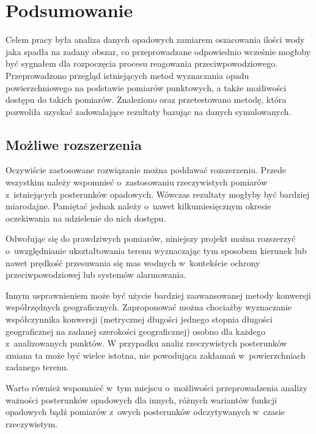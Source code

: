 \chapter{Podsumowanie}

Celem pracy była analiza danych opadowych zamiarem oszacowania ilości wody jaka spadła na zadany obszar, co przeprowadzane odpowiednio wcześnie mogłoby być sygnałem dla rozpoczęcia procesu reagowania przeciwpowodziowego. Przeprowadzono przegląd istniejących metod wyznaczania opadu powierzchniowego na podstawie pomiarów punktowych, a także możliwości dostępu do takich pomiarów. Znaleziono oraz przetestowano metodę, która pozwoliła uzyskać zadowalające rezultaty bazując na danych symulowanych.

\section{Możliwe rozszerzenia}
Oczywiście zastosowane rozwiązanie można poddawać rozszerzeniu. Przede wszystkim należy wspomnieć o~zastosowaniu rzeczywistych pomiarów z~istniejących posterunków opadowych. Wówczas rezultaty mogłyby być bardziej miarodajne. Pamiętać jednak należy o~nawet kilkumiesięcznym okresie oczekiwania na udzielenie do nich dostępu.

Odwołując się do prawdziwych pomiarów, niniejszy projekt można rozszerzyć o~uwzględnianie ukształtowania terenu wyznaczając tym sposobem kierunek lub nawet prędkość przesuwania się mas wodnych w~kontekście ochrony przeciwpowodziowej lub systemów alarmowania.

Innym usprawnieniem może być użycie bardziej zaawansowanej metody konwersji współrzędnych geograficznych. Zaproponować można chociażby wyznaczanie współczynnika konwersji (metrycznej długości jednego stopnia długości geograficznej na zadanej szerokości geograficznej) osobno dla każdego z~analizowanych punktów. W przypadku analiz rzeczywistych posterunków zmiana ta może być wielce istotna, nie powodująca zakłamań w~powierzchniach zadanego terenu.

Warto również wspomnieć w~tym miejscu o~możliwości przeprowadzenia analizy ważności posterunków opadowych dla innych, różnych wariantów funkcji opadowych bądź pomiarów z~owych posterunków odczytywanych w~czasie rzeczywistym.